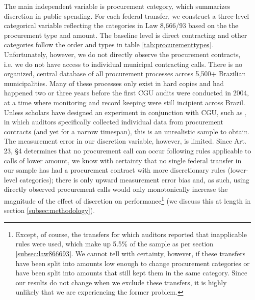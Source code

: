 \documentclass[11pt]{article}
\begin{document}
The main independent variable is procurement category, which summarizes discretion in public spending. For each federal transfer, we construct a three-level categorical variable reflecting the categories in Law 8,666/93 based on the the procurement type and amount. The baseline level is direct contracting and other categories follow the order and types in table \ref{tab:procurementtypes}. Unfortunately, however, we do not directly observe the procurement contracts, i.e. we do not have access to individual municipal contracting calls. There is no organized, central database of all procurement processes across 5,500+ Brazilian municipalities. Many of these processes only exist in hard copies and had happened two or three years before the first CGU audits were conducted in 2004, at a time where monitoring and record keeping were still incipient across Brazil. Unless scholars have designed an experiment in conjunction with CGU, such as \citet{ZamboniAuditRiskRent2018}, in which auditors specifically collected individual data from procurement contracts (and yet for a narrow timespan), this is an unrealistic sample to obtain. The measurement error in our discretion variable, however, is limited. Since Art. 23, \S 4 determines that no procurement call can occur following rules applicable to calls of lower amount, we know with certainty that no single federal transfer in our sample has had a procurement contract with more discretionary rules (lower-level categories); there is only upward measurement error bias and, as such, using directly observed procurement calls would only monotonically increase the magnitude of the effect of discretion on performance\footnote{Except, of course, the transfers for which auditors reported that inapplicable rules were used, which make up 5.5\% of the sample as per section \ref{subsec:law866693}. We cannot tell with certainty, however, if these transfers have been split into amounts low enough to change procurement categories or have been split into amounts that still kept them in the same category. Since our results do not change when we exclude these transfers, it is highly unlikely that we are experiencing the former problem.} (we discuss this at length in section \ref{subsec:methodology}).
\end{document}
